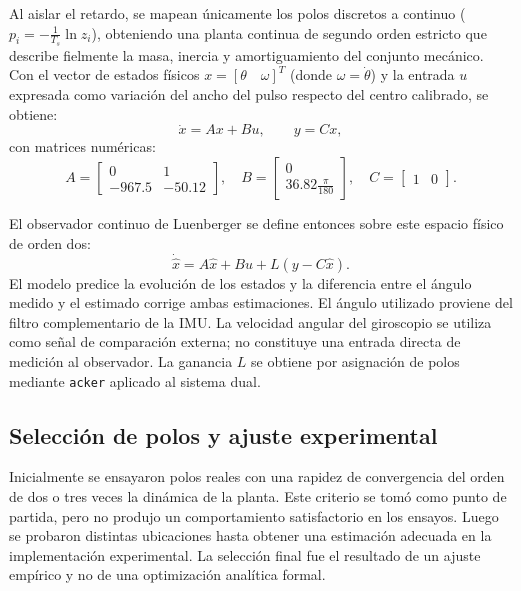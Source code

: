 \documentclass[a4paper, twoside, 10pt, spanish]{article}
\numberwithin{table}{section}
\begin{document}
Al aislar el retardo, se mapean únicamente los polos discretos a continuo ($p_i = -\frac{1}{T_s}\ln z_i$), obteniendo una planta continua de segundo orden estricto que describe fielmente la masa, inercia y amortiguamiento del conjunto mecánico. Con el vector de estados físicos $x = [\theta \quad \omega]^T$ (donde $\omega = \dot\theta$) y la entrada $u$ expresada como variación del ancho del pulso respecto del centro calibrado, se obtiene:
\begin{equation}
\dot x = Ax + Bu, \qquad y = Cx,
\end{equation}
con matrices numéricas:
\begin{equation}
A = \begin{bmatrix} 0 & 1 \\ -967.5 & -50.12 \end{bmatrix}, \quad
B = \begin{bmatrix} 0 \\ 36.82\frac{\pi}{180} \end{bmatrix}, \quad
C = \begin{bmatrix} 1 & 0 \end{bmatrix}.
\end{equation}

El observador continuo de Luenberger se define entonces sobre este espacio físico de orden dos:
\begin{equation}
\dot{\hat x} = A\hat x + Bu + L(y - C\hat x).
\end{equation}
El modelo predice la evolución de los estados y la diferencia entre el ángulo medido y el estimado corrige ambas estimaciones. El ángulo utilizado proviene del filtro complementario de la IMU. La velocidad angular del giroscopio se utiliza como señal de comparación externa; no constituye una entrada directa de medición al observador. La ganancia $L$ se obtiene por asignación de polos mediante \texttt{acker} aplicado al sistema dual.

\subsection{Selección de polos y ajuste experimental}
Inicialmente se ensayaron polos reales con una rapidez de convergencia del orden de dos o tres veces la dinámica de la planta. Este criterio se tomó como punto de partida, pero no produjo un comportamiento satisfactorio en los ensayos. Luego se probaron distintas ubicaciones hasta obtener una estimación adecuada en la implementación experimental. La selección final fue el resultado de un ajuste empírico y no de una optimización analítica formal.
\end{document}
